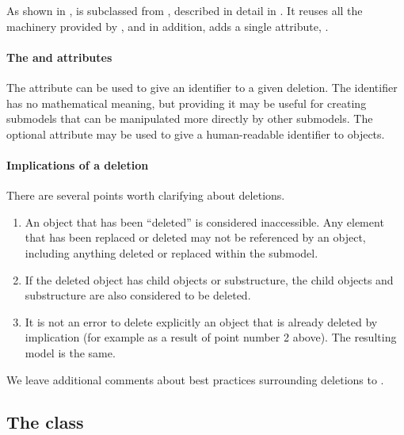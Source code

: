 As shown in , \Deletion is subclassed from \SBaseRef,
described in detail in .  It reuses all the
machinery provided by \SBaseRef, and in addition, adds a single
attribute, .


\paragraph{The \hspace*{1pt} and  attributes}

The \Deletion attribute  can be used to give an identifier to
a given deletion.  The identifier has no mathematical meaning, but
providing it may be useful for creating submodels that can be
manipulated more directly by other submodels.  The optional attribute  may be used to give a human-readable identifier to \Deletion objects.


\paragraph{Implications of a deletion}

There are several points worth clarifying about deletions.

\begin{enumerate}

\item An object that has been ``deleted'' is considered inaccessible.
  Any element that has been replaced or deleted may not be referenced by
  an \SBaseRef object, including anything deleted or replaced within the
  submodel.

\item If the deleted object has child objects or substructure, the child
  objects and substructure are also considered to be deleted.

\item It is not an error to delete explicitly an object that is already
  deleted by implication (for example as a result of point number 2
  above).  The resulting model is the same.

\end{enumerate}

We leave additional comments about best practices surrounding deletions
to .


\subsection{The  class}
\label{sbaseref-class}

